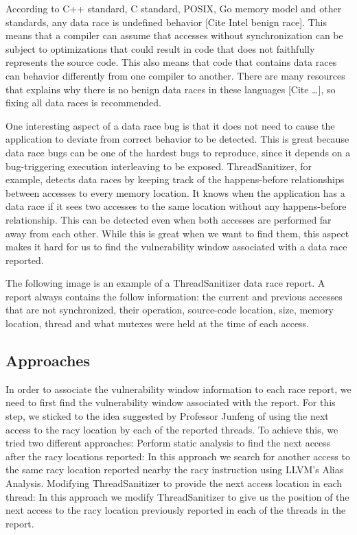 \documentclass{acm_proc_article-sp}
\begin{document}
According to C++ standard, C standard, POSIX, Go memory model and other standards, any data race is undefined behavior [Cite Intel benign race]. This means that a compiler can assume that accesses without synchronization can be subject to optimizations that could result in code that does not faithfully represents the source code. This also means that code that contains data races can behavior differently from one compiler to another. There are many resources that explains why there is no benign data races in these languages [Cite …], so fixing all data races is recommended. 

One interesting aspect of a data race bug is that it does not need to cause the application to deviate from correct behavior to be detected. This is great because data race bugs can be one of the hardest bugs to reproduce, since it depends on a bug-triggering execution interleaving to be exposed. ThreadSanitizer, for example, detects data races by keeping track of the happens-before relationships between accesses to every memory location. It knows when the application has a data race if it sees two accesses to the same location without any happens-before relationship. This can be detected even when both accesses are performed far away from each other. While this is great when we want to find them, this aspect makes it hard for us to find the vulnerability window associated with a data race reported.

The following image is an example of a ThreadSanitizer data race report. A report always contains the follow information: the current and previous accesses that are not synchronized, their operation, source-code location, size, memory location, thread and what mutexes were held at the time of each access.


\subsection{Approaches}
In order to associate the vulnerability window information to each race report, we need to first find the vulnerability window associated with the report. For this step, we sticked to the idea suggested by Professor Junfeng of using the next access to the racy location by each of the reported threads. To achieve this, we tried two different approaches: 
Perform static analysis to find the next access after the racy locations reported:
	In this approach we search for another access to the same racy location reported nearby the racy instruction using LLVM’s Alias Analysis.
	Modifying ThreadSanitizer to provide the next access location in each thread:
		In this approach we modify ThreadSanitizer to give us the position of the next access to the racy location previously reported in each of the threads in the report.
\end{document}
